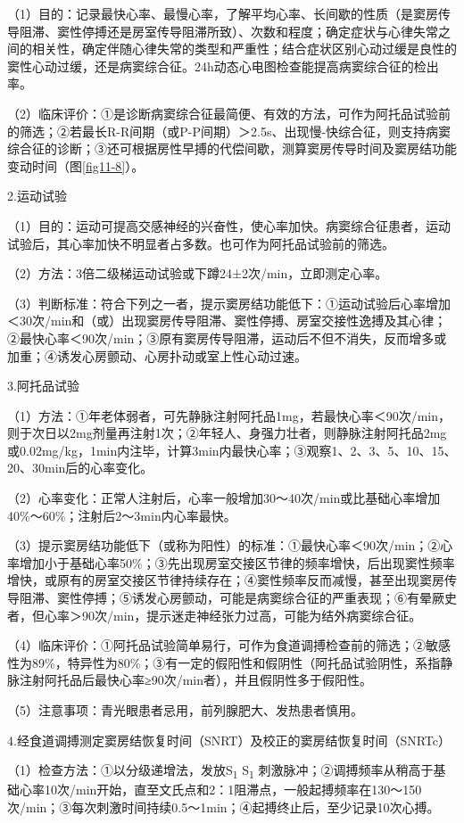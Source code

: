（1）目的：记录最快心率、最慢心率，了解平均心率、长间歇的性质（是窦房传导阻滞、窦性停搏还是房室传导阻滞所致）、次数和程度；确定症状与心律失常之间的相关性，确定伴随心律失常的类型和严重性；结合症状区别心动过缓是良性的窦性心动过缓，还是病窦综合征。24h动态心电图检查能提高病窦综合征的检出率。

（2）临床评价：①是诊断病窦综合征最简便、有效的方法，可作为阿托品试验前的筛选；②若最长R-R间期（或P-P间期）＞2.5s、出现慢-快综合征，则支持病窦综合征的诊断；③还可根据房性早搏的代偿间歇，测算窦房传导时间及窦房结功能变动时间（图\ref{fig11-8}）。

2.运动试验

（1）目的：运动可提高交感神经的兴奋性，使心率加快。病窦综合征患者，运动试验后，其心率加快不明显者占多数。也可作为阿托品试验前的筛选。

（2）方法：3倍二级梯运动试验或下蹲24±2次/min，立即测定心率。

（3）判断标准：符合下列之一者，提示窦房结功能低下：①运动试验后心率增加＜30次/min和（或）出现窦房传导阻滞、窦性停搏、房室交接性逸搏及其心律；②最快心率＜90次/min；③原有窦房传导阻滞，运动后不但不消失，反而增多或加重；④诱发心房颤动、心房扑动或室上性心动过速。

3.阿托品试验

（1）方法：①年老体弱者，可先静脉注射阿托品1mg，若最快心率＜90次/min，则于次日以2mg剂量再注射1次；②年轻人、身强力壮者，则静脉注射阿托品2mg或0.02mg/kg，1min内注毕，计算3min内最快心率；③观察1、2、3、5、10、15、20、30min后的心率变化。

（2）心率变化：正常人注射后，心率一般增加30～40次/min或比基础心率增加40\%～60\%；注射后2～3min内心率最快。

（3）提示窦房结功能低下（或称为阳性）的标准：①最快心率＜90次/min；②心率增加小于基础心率50\%；③先出现房室交接区节律的频率增快，后出现窦性频率增快，或原有的房室交接区节律持续存在；④窦性频率反而减慢，甚至出现窦房传导阻滞、窦性停搏；⑤诱发心房颤动，可能是病窦综合征的严重表现；⑥有晕厥史者，但心率＞90次/min，提示迷走神经张力过高，可能为结外病窦综合征。

（4）临床评价：①阿托品试验简单易行，可作为食道调搏检查前的筛选；②敏感性为89\%，特异性为80\%；③有一定的假阳性和假阴性（阿托品试验阴性，系指静脉注射阿托品后最快心率≥90次/min者），并且假阴性多于假阳性。

（5）注意事项：青光眼患者忌用，前列腺肥大、发热患者慎用。

4.经食道调搏测定窦房结恢复时间（SNRT）及校正的窦房结恢复时间（SNRTc）

（1）检查方法：①以分级递增法，发放S\textsubscript{1} S\textsubscript{1}
刺激脉冲；②调搏频率从稍高于基础心率10次/min开始，直至文氏点和2：1阻滞点，一般起搏频率在130～150次/min；③每次刺激时间持续0.5～1min；④起搏终止后，至少记录10次心搏。

